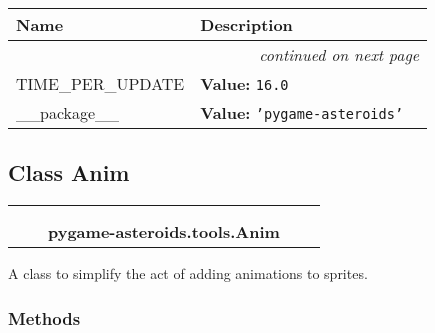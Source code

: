     \vspace{-1cm}
\hspace{\varindent}\begin{longtable}{|p{\varnamewidth}|p{\vardescrwidth}|l}
\cline{1-2}
\cline{1-2} \centering \textbf{Name} & \centering \textbf{Description}& \\
\cline{1-2}
\endhead\cline{1-2}\multicolumn{3}{r}{\small\textit{continued on next page}}\\\endfoot\cline{1-2}
\endlastfoot\raggedright T\-I\-M\-E\-\_\-P\-E\-R\-\_\-U\-P\-D\-A\-T\-E\- & \raggedright \textbf{Value:} 
{\tt 16.0}&\\
\cline{1-2}
\raggedright \_\-\_\-p\-a\-c\-k\-a\-g\-e\-\_\-\_\- & \raggedright \textbf{Value:} 
{\tt \texttt{'}\texttt{pygame-asteroids}\texttt{'}}&\\
\cline{1-2}
\end{longtable}



\subsection{Class Anim}

    \label{pygame-asteroids:tools:Anim}
\begin{tabular}{cccccc}
\multicolumn{2}{r}{\settowidth{\BCL}{object}\multirow{2}{\BCL}{object}}
&&
  \\\cline{3-3}
  &&\multicolumn{1}{c|}{}
&&
  \\
&&\multicolumn{2}{l}{\textbf{pygame-asteroids.tools.Anim}}
\end{tabular}

A class to simplify the act of adding animations to sprites.



  \subsubsection{Methods}


